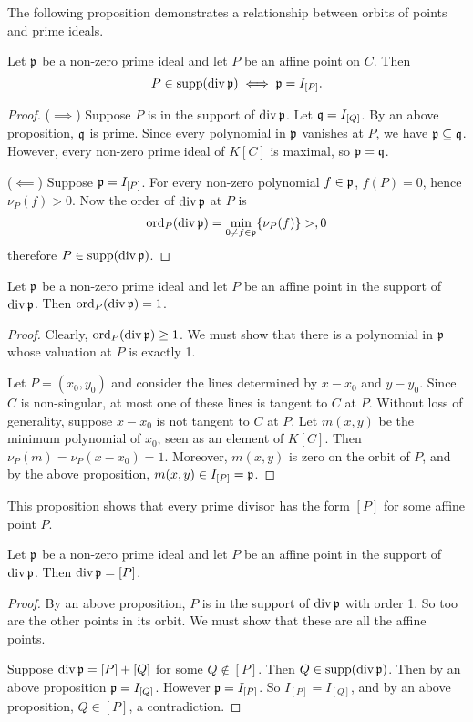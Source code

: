 The following proposition demonstrates a relationship between orbits of points and prime ideals.
\begin{proposition}
  Let $\frak p$ be a non-zero prime ideal and let $P$ be an affine point on $C$. Then
  \[ P \in \supp(\div \frak p) \iff \frak p = I_{[P]}. \]
\end{proposition}
\begin{proof}
  ($\implies$)
  Suppose $P$ is in the support of $\div \frak p$.
  Let $\frak q = I_{[Q]}$.
  By an above proposition, $\frak q$ is prime.
  Since every polynomial in $\frak p$ vanishes at $P$, we have $\frak p \subseteq \frak q$.
  However, every non-zero prime ideal of $K[C]$ is maximal, so $\frak p = \frak q$.
  
  ($\impliedby$)
  Suppose $\frak p = I_{[P]}$.
  For every non-zero polynomial $f \in \frak p$, $f(P) = 0$, hence $\nu_P(f) > 0$.
  Now the order of $\div \frak p$ at $P$ is
  \[ \ord_P(\div \frak p) = \min_{0 \neq f \in \frak p}\{ \nu_P(f) \} > ,0 \]
  therefore $P \in \supp(\div \frak p)$.
\end{proof}

\begin{proposition}
  Let $\frak p$ be a non-zero prime ideal and let $P$ be an affine point in the support of $\div \frak p$.
  Then $\ord_P(\div \frak p) = 1$.
\end{proposition}
\begin{proof}
  Clearly, $\ord_P(\div \frak p) \geq 1$.
  We must show that there is a polynomial in $\frak p$ whose valuation at $P$ is exactly 1.
  
  Let $P = (x_0, y_0)$ and consider the lines determined by $x - x_0$ and $y - y_0$.
  Since $C$ is non-singular, at most one of these lines is tangent to $C$ at $P$.
  Without loss of generality, suppose $x - x_0$ is not tangent to $C$ at $P$.
  Let $m(x, y)$ be the minimum polynomial of $x_0$, seen as an element of $K[C]$.
  Then $\nu_P(m) = \nu_P(x - x_0) = 1$.
  Moreover, $m(x, y)$ is zero on the orbit of $P$,
  and by the above proposition, $m(x, y) \in I_{[P]} = \frak p$.
\end{proof}

This proposition shows that every prime divisor has the form $[P]$ for some affine point $P$.
\begin{proposition}
  Let $\frak p$ be a non-zero prime ideal and let $P$ be an affine point in the support of $\div \frak p$.
  Then $\div \frak p = [P]$.
\end{proposition}
\begin{proof}
  By an above proposition, $P$ is in the support of $\div \frak p$ with order 1.
  So too are the other points in its orbit. 
  We must show that these are all the affine points.
  
  Suppose $\div \frak p = [P] + [Q]$ for some $Q \not\in [P]$.
  Then $Q \in \supp(\div \frak p)$.
  Then by an above proposition $\frak p = I_{[Q]}$.
  However $\frak p = I_{[P]}$.
  So $I_{[P]} = I_{[Q]}$, and by an above proposition, $Q \in [P]$, a contradiction.
\end{proof}

